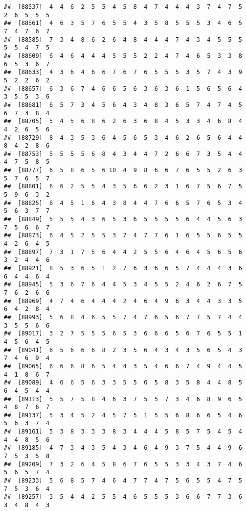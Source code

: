 \documentclass[
]{book}
\begin{document}
\begin{verbatim}
##  [88537]  4  4  6  2  5  5  4  5  8  4  7  4  4  4  3  7  4  7  5  2  6  5  5  5
##  [88561]  4  6  3  5  7  6  5  5  4  3  5  8  5  5  5  3  4  6  5  7  4  7  6  7
##  [88585]  7  3  4  8  6  2  6  4  8  4  4  4  7  4  3  4  5  5  5  5  5  4  7  5
##  [88609]  6  4  6  4  4  4  5  5  5  2  2  4  7  4  6  5  3  3  8  6  5  3  6  7
##  [88633]  4  3  6  4  6  6  7  6  7  6  5  5  5  3  5  7  4  3  9  5  2  2  6  2
##  [88657]  6  3  6  7  4  6  6  5  6  3  6  3  6  1  5  6  5  6  4  3  5  5  3  6
##  [88681]  6  5  7  3  4  5  6  4  3  4  8  3  6  5  7  4  7  4  5  6  7  3  8  4
##  [88705]  5  4  5  6  8  6  2  6  3  6  8  4  5  3  3  4  6  8  4  4  2  6  5  6
##  [88729]  8  4  3  5  3  6  4  5  6  5  3  4  6  2  6  5  6  4  4  8  4  2  8  6
##  [88753]  5  5  5  5  6  8  4  3  4  4  7  2  6  6  7  3  5  4  4  4  7  5  8  5
##  [88777]  6  5  8  6  5  6 10  4  9  8  6  6  7  6  5  5  2  6  3  5  7  6  5  7
##  [88801]  6  6  2  5  5  4  3  5  6  6  2  3  1  6  7  5  6  7  5  5  9  6  3  2
##  [88825]  6  4  5  1  6  4  3  8  4  4  7  6  6  5  7  6  5  3  4  5  6  3  7  7
##  [88849]  5  5  5  4  3  6  5  3  6  5  5  5  5  6  4  4  5  6  3  7  5  6  6  7
##  [88873]  6  4  5  2  5  5  3  7  4  7  7  6  1  6  5  5  6  5  5  4  2  6  4  5
##  [88897]  7  3  1  7  5  6  4  4  2  5  5  6  4  6  4  5  6  5  6  3  2  4  4  6
##  [88921]  8  5  3  6  5  1  2  7  6  3  6  6  5  7  4  4  4  3  6  6  4  4  6  4
##  [88945]  5  3  6  7  6  4  4  5  3  4  5  5  2  4  6  2  6  7  5  7  6  2  6  6
##  [88969]  4  7  4  6  4  4  4  2  4  6  4  9  6  3  4  4  3  3  5  6  4  2  8  4
##  [88993]  5  6  8  4  6  5  5  7  4  7  6  5  6  7  7  5  7  4  4  3  5  5  6  6
##  [89017]  3  2  7  5  5  5  6  5  3  6  6  6  5  6  7  6  5  5  1  4  5  6  4  5
##  [89041]  6  5  6  6  6  8  2  3  5  6  4  3  4  3  5  6  5  4  3  7  4  6  9  4
##  [89065]  6  6  6  8  6  5  4  4  3  5  4  6  6  7  4  9  4  4  5  4  1  8  6  7
##  [89089]  4  6  6  5  6  3  3  5  5  6  5  8  3  5  8  4  4  8  5  6  4  5  4  4
##  [89113]  5  5  7  5  8  4  6  3  7  5  5  7  3  4  6  8  9  6  5  4  8  7  6  7
##  [89137]  5  3  4  5  2  4  5  7  5  1  5  5  6  8  6  6  5  4  6  5  6  3  7  4
##  [89161]  5  3  8  3  3  3  8  3  4  4  4  5  8  5  7  5  4  5  4  4  4  8  5  6
##  [89185]  4  7  3  4  3  5  4  3  4  6  4  9  3  7  5  4  4  9  6  7  5  3  5  8
##  [89209]  7  3  2  6  4  5  8  6  7  6  5  5  3  3  4  3  7  4  6  5  6  5  7  4
##  [89233]  5  6  8  5  7  4  6  4  7  7  4  7  5  6  5  5  4  7  5  7  5  3  6  4
##  [89257]  3  5  4  4  2  5  5  4  6  5  5  5  3  6  6  7  7  3  6  3  4  8  4  3

\end{verbatim}
\end{document}

